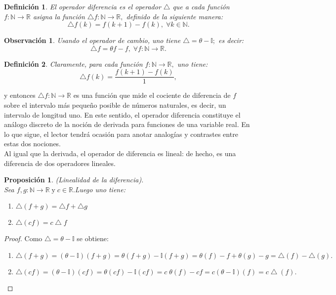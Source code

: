 \documentclass[a4,paper]{article}
\newtheorem{defi}{Definición}[section]
\newtheorem{obs}{Observación}[section]
\newtheorem{prop}{Proposición}[section]
\begin{document}
	\begin{defi}
		El operador diferencia es el operador $ \bigtriangleup $ que a cada función $ f:\mathbb{N} \to \mathbb{R} $ asigna la función $\bigtriangleup f:\mathbb{N} \to \mathbb{R},$ definido de la siguiente manera:
		$$
		\bigtriangleup f(k)=f(k+1)-f(k), \; \forall k \in \mathbb{N}.
		$$ 
	\end{defi}
	\begin{obs}
		Usando el operador de cambio, uno tiene $ \bigtriangleup=\theta - \mathbb{I};$ es decir:
		$$
		\bigtriangleup f= \theta f-f, \; \forall f:\mathbb{N} \to \mathbb{R}.
		$$
	\end{obs}
	\begin{defi}
		Claramente, para cada función $ f: \mathbb{N} \to \mathbb{R},$ uno tiene:
		$$
		\bigtriangleup f(k)=\frac{f(k+1)-f(k)}{1},
		$$
	\end{defi}
	\noindent y entonces $ \bigtriangleup f:\mathbb{N} \to \mathbb{R} $ es una función que mide el cociente de diferencia de $ f $ sobre
	el intervalo más pequeño posible de números naturales, es decir, un intervalo de longitud uno.
	En este sentido, el operador diferencia constituye el análogo discreto de la noción de derivada para funciones de una variable real. En lo que sigue, el lector tendrá
	ocasión para anotar analogías y contrastes entre estas dos nociones.\\
	Al igual que la derivada, el operador de diferencia es lineal: de hecho, es una diferencia
	de dos operadores lineales.
	\begin{prop}
		(Linealidad de la diferencia).\\Sea $ f,g:\mathbb{N} \to \mathbb{R} \; \text{y} \; c \in \mathbb{R}.$Luego uno tiene:
		\begin{enumerate}[1.]
			\item $\bigtriangleup (f+g)= \bigtriangleup f + \bigtriangleup g$
			\item $ \bigtriangleup(cf)=c \bigtriangleup f $
		\end{enumerate}
	\end{prop}
			\begin{proof}
				 Como $ \bigtriangleup=\theta - \mathbb{I}$ se obtiene:
			\begin{enumerate}[1.]
				\item
					$\bigtriangleup(f+g)=(\theta-\mathbb{I} )(f+g)=\theta (f+g)-\mathbb{I}(f+g)=\theta(f)-f+\theta(g)-g=\bigtriangleup(f)-\bigtriangleup(g).$
				\item $\bigtriangleup(cf)=(\theta-\mathbb{I})(cf)=\theta(cf)-\mathbb{I}(cf)=c\;\theta(f)-cf=c(\theta -\mathbb{I})(f)=c \bigtriangleup(f).$
			\end{enumerate}
			\end{proof}
\end{document}
